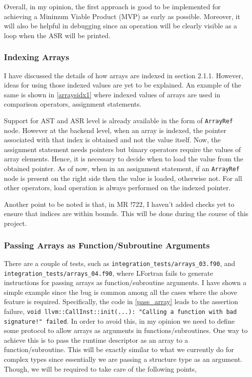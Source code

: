 Overall, in my opinion, the first approach is good to be implemented for achieving a Minimum Viable Product (MVP) as early as possible. Moreover, it will also be helpful in debugging since an operation will be clearly visible as a loop when the ASR will be printed.



\subsubsection{Indexing Arrays}

I have discussed the details of how arrays are indexed in section 2.1.1. However, ideas for using those indexed values are yet to be explained. An example of the same is shown in \ref{arraysidx1} where indexed values of arrays are used in comparison operators, assignment statements.



Support for AST and ASR level is already available in the form of \texttt{ArrayRef} node. However at the backend level, when an array is indexed, the pointer associated with that index is obtained and not the value itself. Now, the assignment statement needs pointers but binary operators require the values of array elements. Hence, it is necessary to decide when to load the value from the obtained pointer. As of now, when in an assignment statement, if an \texttt{ArrayRef} node is present on the right side then the value is loaded, otherwise not. For all other operators, load operation is always performed on the indexed pointer.

Another point to be noted is that, in MR !722, I haven't added checks yet to ensure that indices are within bounds. This will be done during the course of this project.

\subsubsection{Passing Arrays as Function/Subroutine Arguments}

There are a couple of tests, such as \texttt{integration\_tests/arrays\_03.f90}, and \texttt{integration\_tests/arrays\_04.f90}, where LFortran fails to generate instructions for passing arrays as function/subroutine arguments. I have shown a simple example since the bug is common among all the cases where the above feature is required. Specifically, the code in \ref{pass_array} leads to the assertion failure, \texttt{void llvm::CallInst::init(...): "Calling a function with bad signature!" failed}. In order to avoid this, in my opinion we need to define some protocol to allow arrays as arguments in functions/subroutines. One way to achieve this is to pass the runtime descriptor as an array to a function/subroutine. This will be exactly similar to what we currently do for complex types since essentially we are passing a structure type as an argument. Though, we will be required to take care of the following points,

